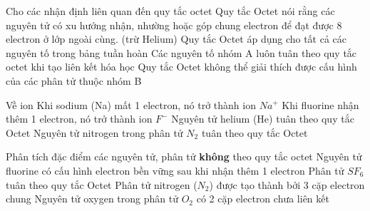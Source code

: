 \begin{ex}
	Cho các nhận định liên quan đến quy tắc octet
	\choiceTF
	{\True Quy tắc Octet nói rằng các nguyên tử có xu hướng nhận, nhường hoặc góp chung electron để đạt được 8 electron ở lớp ngoài cùng. (trừ Helium)}
	{Quy tắc Octet áp dụng cho tất cả các nguyên tố trong bảng tuần hoàn}
	{Các nguyên tố nhóm A luôn tuân theo quy tắc octet khi tạo liên kết hóa học}
	{\True Quy tắc Octet không thể giải thích được cấu hình của các phân tử thuộc nhóm B}
	{}
	\loigiai{}
\end{ex}

\begin{ex}
	Về ion
	\choiceTF
	{\True Khi sodium (Na) mất 1 electron, nó trở thành ion $Na^+$}
	{\True Khi fluorine nhận thêm 1 electron, nó trở thành ion $F^-$}
	{Nguyên tử helium (He) tuân theo quy tắc Octet}
	{\True Nguyên tử nitrogen trong phân tử $N_2$ tuân theo quy tắc Octet}
	\loigiai{}
\end{ex}

\begin{ex}
	Phân tích đặc điểm các nguyên tử, phân tử \textbf{không} theo quy tắc octet
	\choiceTF
	{Nguyên tử fluorine có cấu hình electron bền vững sau khi nhận thêm 1 electron}
	{\True Phân tử $SF_6$ tuân theo quy tắc Octet}
	{Phân tử nitrogen ($N_2$) được tạo thành bởi 3 cặp electron chung}
	{Nguyên tử oxygen trong phân tử $O_2$ có 2 cặp electron chưa liên kết}
	\loigiai{}
\end{ex}

